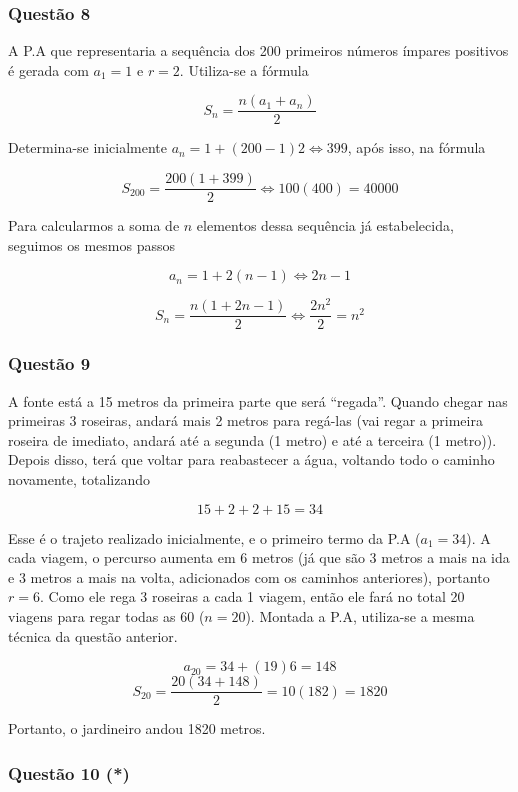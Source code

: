 \subsubsection*{Questão 8}

\hrulefill

A P.A que representaria a sequência dos 200 primeiros números ímpares positivos é gerada com $a_{1} = 1$ e $r = 2$. Utiliza-se a fórmula

\[S_{n} = \frac{n(a_{1} + a_{n})}{2}\]

Determina-se inicialmente $a_{n} = 1 + (200 - 1)2 \Leftrightarrow 399$, após isso, na fórmula

\[S_{200} = \frac{200(1 + 399)}{2} \Leftrightarrow 100(400) = 40000\]

Para calcularmos a soma de $n$ elementos dessa sequência já estabelecida, seguimos os mesmos passos

\[a_{n} = 1 + 2(n - 1) \Leftrightarrow 2n - 1\]

\[S_{n} = \frac{n(1 + 2n - 1)}{2} \Leftrightarrow \frac{2n^{2}}{2} = n^{2}\]

\subsubsection*{Questão 9}

\hrulefill

A fonte está a 15 metros da primeira parte que será ``regada''. Quando chegar nas primeiras 3 roseiras, andará mais 2 metros para regá-las (vai regar a primeira roseira de imediato, andará até a segunda (1 metro) e até a terceira (1 metro)). Depois disso, terá que voltar para reabastecer a água, voltando todo o caminho novamente, totalizando

\[15 + 2 + 2 + 15 = 34\]

Esse é o trajeto realizado inicialmente, e o primeiro termo da P.A ($a_{1} = 34$). A cada viagem, o percurso aumenta em 6 metros (já que são 3 metros a mais na ida e 3 metros a mais na volta, adicionados com os caminhos anteriores), portanto $r = 6$. Como ele rega 3 roseiras a cada 1 viagem, então ele fará no total 20 viagens para regar todas as 60 ($n = 20$). Montada a P.A, utiliza-se a mesma técnica da questão anterior.

\[a_{20} = 34 + (19)6 = 148\]
\[S_{20} = \frac{20(34 + 148)}{2} = 10(182) = 1820\]

Portanto, o jardineiro andou 1820 metros.

\subsubsection*{Questão 10 (*)}

